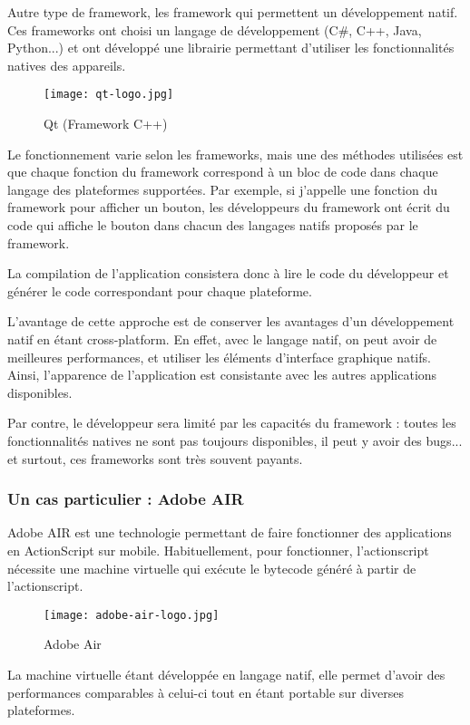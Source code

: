 \documentclass[11pt, a4paper, twoside]{report}
\begin{document}
Autre type de framework, les framework qui permettent un développement natif. Ces frameworks ont choisi un langage de développement (C\#, C++, Java, Python...) et ont développé une librairie permettant d'utiliser les fonctionnalités natives des appareils.
\begin{wrapfigure}{i}{0.25\textwidth}
   \vspace{-12pt}
  \centering
    \texttt{[image: qt-logo.jpg]}
       \vspace{-10pt}
  \caption{Qt (Framework C++)}
     \vspace{-20pt}
\end{wrapfigure}
Le fonctionnement varie selon les frameworks, mais une des méthodes utilisées est que chaque fonction du framework correspond à un bloc de code dans chaque langage des plateformes supportées. Par exemple, si j'appelle une fonction du framework pour afficher un bouton, les développeurs du framework ont écrit du code qui affiche le bouton dans chacun des langages natifs proposés par le framework. 

La compilation de l'application consistera donc à lire le code du développeur et générer le code correspondant pour chaque plateforme.

L'avantage de cette approche est de conserver les avantages d'un développement natif en étant cross-platform. En effet, avec le langage natif, on peut avoir de meilleures performances, et utiliser les éléments d'interface graphique natifs. Ainsi, l'apparence de l'application est consistante avec les autres applications disponibles.

Par contre, le développeur sera limité par les capacités du framework : toutes les fonctionnalités natives ne sont pas toujours disponibles, il peut y avoir des bugs... et surtout, ces frameworks sont très souvent payants.

\subsubsection{Un cas particulier : Adobe AIR}

Adobe AIR est une technologie permettant de faire fonctionner des applications en ActionScript sur mobile. Habituellement, pour fonctionner, l'actionscript nécessite une machine virtuelle qui exécute le bytecode généré à partir de l'actionscript.
\begin{wrapfigure}{i}{0.25\textwidth}
   \vspace{-12pt}
  \centering
    \texttt{[image: adobe-air-logo.jpg]}
       \vspace{-5pt}
  \caption{Adobe Air}
     \vspace{-10pt}
\end{wrapfigure}
La machine virtuelle étant développée en langage natif, elle permet d'avoir des performances comparables à celui-ci tout en étant portable sur diverses plateformes. 
\end{document}
